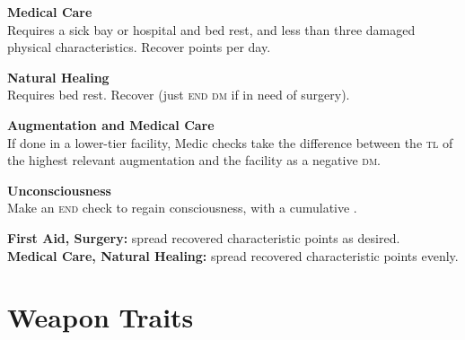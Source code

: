 \documentclass{cheatsheet}
\begin{document}
\begin{multicols}{2}
\textbf{Medical Care}\\
Requires a sick bay or hospital and bed rest, and less than three
damaged physical characteristics.  Recover  points per day.

\textbf{Natural Healing}\\
Requires bed rest.  Recover  (just \textsc{end dm}
if in need of surgery).

\textbf{Augmentation and Medical Care}\\
If done in a lower-tier facility, Medic checks take the difference
between the \textsc{tl} of the highest relevant augmentation and the
facility as a negative \textsc{dm}.

\textbf{Unconsciousness}\\
Make an \textsc{end} check to regain consciousness, with a cumulative
.

\textbf{First Aid, Surgery:} spread recovered characteristic points as desired.\\
\textbf{Medical Care, Natural Healing:} spread recovered characteristic points evenly.
\end{multicols}

\section{Weapon Traits}
\end{document}
